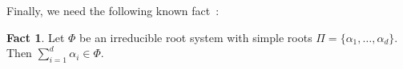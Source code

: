 \documentclass[10pt,a4paper]{article}
\newtheorem{lemma}[theorem]{Lemma}
\theoremstyle{definition}
\newtheorem{fact}[theorem]{Fact}
\begin{document}
Finally, we need the following known fact~\cite{Hil16}:
\begin{fact} \label{fact:simplerootsum}
    Let $\Phi$ be an irreducible root system with simple roots $\Pi = \{\alpha_1, \dots, \alpha_d\}$.
    Then $\sum_{i=1}^d \alpha_i \in \Phi$.
\end{fact}
%
%
%
%
%
%

%
\end{document}
